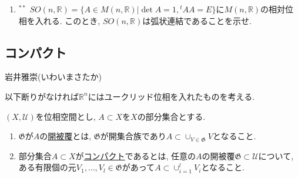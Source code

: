 \documentclass[dvipdfmx,a4paper,11pt]{article}
\newcommand{\R}{\mathbb{R}}
\theoremstyle{definition}
\begin{document}
\begin{enumerate}[label=\textbf{問}\ref*{sec-connected}.\arabic*]
\item $^{**}$ $SO(n, \R) = \{ A \in M(n,\R) | \det A =1, {}^{t}AA =E\}$に$M(n,\R)$の相対位相を入れる. このとき, $SO(n, \R)$は弧状連結であることを示せ.

 	\end{enumerate}
 
\newpage



\begin{center}
\section{コンパクト}%
\label{sec-compact}
\end{center}

\begin{flushright}
 岩井雅崇(いわいまさたか)
\end{flushright}

以下断りがなければ$\R^{n}$にはユークリッド位相を入れたものを考える. 

\begin{tcolorbox}[
   colback = white,
   colframe = green!35!black,
    fonttitle = \bfseries,
    breakable = true]
    $(X, \mathscr{U})$を位相空間とし, $A \subset X$を$X$の部分集合とする. 
    \begin{enumerate}
    \setlength{\parskip}{0cm} 
  \setlength{\itemsep}{0pt} 
    \item  $\mathfrak{G}$が$A$の\underline{開被覆}とは, $\mathfrak{G} $が開集合族であり$A \subset \cup_{V \in \mathfrak{G}}V$となること.
    \item 部分集合$A \subset X$が\underline{コンパクト}であるとは, 任意の$A$の開被覆$\mathfrak{G} \subset \mathscr{U}$について, ある有限個の元$V_1, \ldots, V_l \in \mathfrak{G}$があって$A \subset \cup_{i=1}^{l} V_i$となること.
    \end{enumerate}
 \end{tcolorbox}


\end{document}
